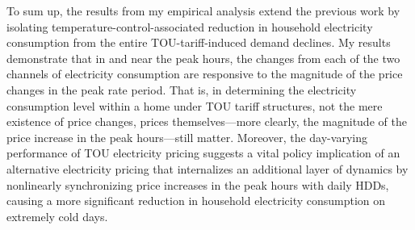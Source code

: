 To sum up, the results from my empirical analysis extend the previous work by isolating temperature-control-associated reduction in household electricity consumption from the entire TOU-tariff-induced demand declines. My results demonstrate that in and near the peak hours, the changes from each of the two channels of electricity consumption are responsive to the magnitude of the price changes in the peak rate period. That is, in determining the electricity consumption level within a home under TOU tariff structures, not the mere existence of price changes, prices themselves---more clearly, the magnitude of the price increase in the peak hours---still matter. Moreover, the day-varying performance of TOU electricity pricing suggests a vital policy implication of an alternative electricity pricing that internalizes an additional layer of dynamics by nonlinearly synchronizing price increases in the peak hours with daily HDDs, causing a more significant reduction in household electricity consumption on extremely cold days. 
